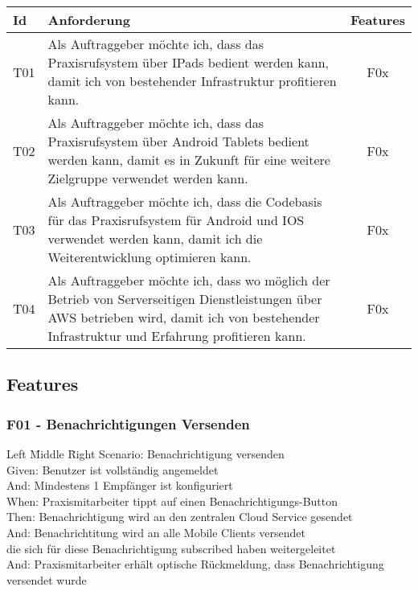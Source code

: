 \begin{table}[h]
    \centering
    \begin{tabular}{|l|p{13cm}|c|}
        \hline
        \textbf{Id} & \textbf{Anforderung}                                                              & \textbf{Features} \\
        \hline
        T01         & Als Auftraggeber möchte ich, dass das Praxisrufsystem über IPads bedient werden kann, damit ich von bestehender Infrastruktur profitieren kann. & F0x \\
        \hline
        T02         & Als Auftraggeber möchte ich, dass das Praxisrufsystem über Android Tablets bedient werden kann, damit es in Zukunft für eine weitere Zielgruppe verwendet werden kann. & F0x \\
        \hline
        T03         & Als Auftraggeber möchte ich, dass die Codebasis für das Praxisrufsystem für Android und IOS verwendet werden kann, damit ich die Weiterentwicklung optimieren kann. & F0x \\
        \hline
        T04         & Als Auftraggeber möchte ich, dass wo möglich der Betrieb von Serverseitigen Dienstleistungen über AWS betrieben wird, damit ich von bestehender Infrastruktur und Erfahrung profitieren kann. & F0x               \\
        \hline
    \end{tabular}\label{tab:userstories3}
\end{table}

\clearpage

\subsection{Features}\label{subsec:features}

    \subsubsection*{F01 - Benachrichtigungen Versenden}
        \begin{tabbing}
            Left \= Middle \= Right \kill
            Scenario: \> \> Benachrichtigung versenden\\
            Given:  \> \> Benutzer ist vollständig angemeldet\\
            And:    \> \> Mindestens 1 Empfänger ist konfiguriert\\
            When:   \> \> Praxismitarbeiter tippt auf einen Benachrichtigungs-Button\\
            Then:   \> \> Benachrichtigung wird an den zentralen Cloud Service gesendet\\
            And:    \> \> Benachrichtitung wird an alle Mobile Clients versendet\\
                 \> \> \> die sich für diese Benachrichtigung subscribed haben weitergeleitet\\
            And:    \> \> Praxismitarbeiter erhält optische Rückmeldung, dass Benachrichtigung versendet wurde\\
        \end{tabbing}




